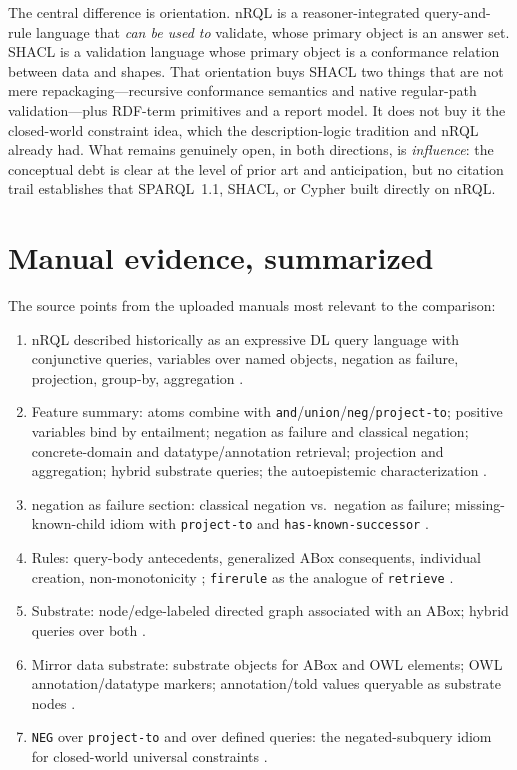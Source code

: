 \documentclass[11pt,letterpaper]{article}
\theoremstyle{definition}
\newcommand{\nrql}{nRQL}
\newcommand{\shacl}{SHACL}
\newcommand{\naf}{negation as failure}
\newcommand{\abox}{ABox}
\newcommand{\rdf}{RDF}
\newcommand{\owl}{OWL}
\begin{document}
The central difference is orientation. \nrql{} is a reasoner-integrated query-and-rule language that \emph{can be used to} validate, whose primary object is an answer set. \shacl{} is a validation language whose primary object is a conformance relation between data and shapes. That orientation buys \shacl{} two things that are not mere repackaging---recursive conformance semantics and native regular-path validation---plus \rdf{}-term primitives and a report model. It does not buy it the closed-world constraint idea, which the description-logic tradition and \nrql{} already had. What remains genuinely open, in both directions, is \emph{influence}: the conceptual debt is clear at the level of prior art and anticipation, but no citation trail establishes that SPARQL~1.1, \shacl{}, or Cypher built directly on \nrql{}.

\appendix
\section{Manual evidence, summarized}\label{sec:appendix}
The source points from the uploaded manuals most relevant to the comparison:
\begin{enumerate}[leftmargin=2em]
  \item \nrql{} described historically as an expressive DL query language with conjunctive queries, variables over named objects, \naf{}, projection, group-by, aggregation \cite[p.~4]{racerug}.
  \item Feature summary: atoms combine with \texttt{and}/\texttt{union}/\texttt{neg}/\texttt{project-to}; positive variables bind by entailment; \naf{} and classical negation; concrete-domain and datatype/annotation retrieval; projection and aggregation; hybrid substrate queries; the autoepistemic characterization \cite[pp.~81--84]{racerug}.
  \item \naf{} section: classical negation vs.\ \naf{}; missing-known-child idiom with \texttt{project-to} and \texttt{has-known-successor} \cite[pp.~113--120]{racerug}.
  \item Rules: query-body antecedents, generalized \abox{} consequents, individual creation, non-monotonicity \cite[pp.~125--127]{racerug}; \texttt{firerule} as the analogue of \texttt{retrieve} \cite[pp.~160--161]{racerrm}.
  \item Substrate: node/edge-labeled directed graph associated with an \abox{}; hybrid queries over both \cite[pp.~133--137]{racerug}.
  \item Mirror data substrate: substrate objects for \abox{} and \owl{} elements; \owl{} annotation/datatype markers; annotation/told values queryable as substrate nodes \cite[pp.~137--143]{racerug}.
  \item \texttt{NEG} over \texttt{project-to} and over defined queries: the negated-subquery idiom for closed-world universal constraints \cite[pp.~119--122]{racerug}.
\end{enumerate}
\end{document}
